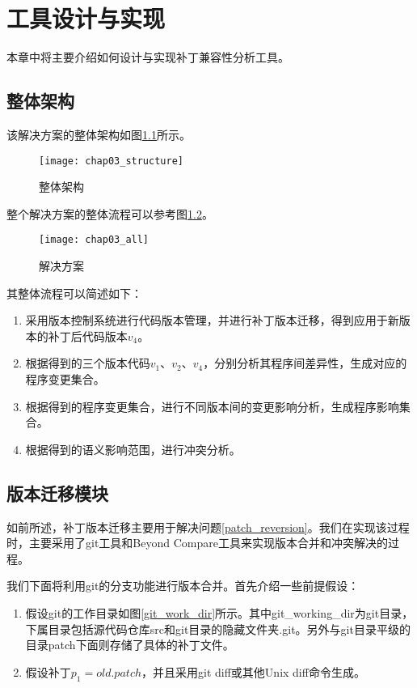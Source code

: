 \chapter{工具设计与实现}
本章中将主要介绍如何设计与实现补丁兼容性分析工具。

\section{整体架构}

该解决方案的整体架构如图\ref {structure}所示。

\begin{figure}[H]
	\centering
	\texttt{[image: chap03\_structure]}
	\caption {整体架构}	
	\label {structure}
\end{figure}

整个解决方案的整体流程可以参考图\ref {solution_all}。

\begin{figure}[H]
	\centering
	\texttt{[image: chap03\_all]}
	\caption {解决方案}
	\label {solution_all}	
\end{figure}

其整体流程可以简述如下：

\begin{enumerate}
	\item 采用版本控制系统进行代码版本管理，并进行补丁版本迁移，得到应用于新版本的补丁后代码版本$v_4$。
	\item 根据得到的三个版本代码$v_1$、$v_2$、$v_4$，分别分析其程序间差异性，生成对应的程序变更集合。
	\item 根据得到的程序变更集合，进行不同版本间的变更影响分析，生成程序影响集合。
	\item 根据得到的语义影响范围，进行冲突分析。
\end{enumerate}

\section{版本迁移模块}

如前所述，补丁版本迁移主要用于解决问题\ref {patch_reversion}。我们在实现该过程时，主要采用了git工具和Beyond Compare工具来实现版本合并和冲突解决的过程。

我们下面将利用git的分支功能进行版本合并。首先介绍一些前提假设：

\begin{enumerate}
	\item 假设git的工作目录如图\ref {git_work_dir}所示。其中git\_working\_dir为git目录，下属目录包括源代码仓库src和git目录的隐藏文件夹.git。另外与git目录平级的目录patch下面则存储了具体的补丁文件。

	\item 假设补丁$p_1 = old.patch$，并且采用git diff或其他Unix diff命令生成。
\end{enumerate}

